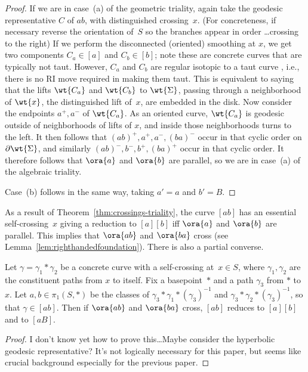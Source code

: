 \begin{proof}
  If we are in case~(a) of the geometric triality, again take the
  geodesic representative $C$ of $ab$, with distinguished
  crossing~$x$. (For concreteness, if necessary reverse the
  orientation of~$S$ so the branches appear in order \dots crossing to
  the right) If we
  perform the disconnected (oriented) smoothing at $x$, we get two
  components $C_a \in [a]$ and $C_b \in [b]$; note these are concrete
  curves that are typically not taut. However, $C_a$ and $C_b$ are
  regular isotopic to a taut curve \cite[Lemma 5.5]{Thurston14:PBI},
  i.e., there is no RI move required in making them taut. This is
  equivalent to saying that the lifts $\wt{C_a}$ and $\wt{C_b}$ to
  $\wt{\Sigma}$, passing through a neighborhood of $\wt{x}$, the
  distinguished lift of~$x$, are embedded in the disk. Now consider
  the endpoints $a^+, a^-$ of $\wt{C_a}$. As an oriented curve,
  $\wt{C_a}$ is geodesic outside of neighborhoods of lifts of $x$, and
  inside those neighborhoods turns to the left. It then follows that
  $(ab)^+, a^+, a^-, (ba)^-$ occur in that cyclic order on
  $\partial \wt{\Sigma}$, and similarly $(ab)^-, b^-,b^+,(ba)^+$ occur
  in that cyclic order. It therefore follows that $\ora{a}$ and
  $\ora{b}$ are parallel, so we are in case~(a) of the algebraic
  triality.

  Case~(b) follows in the same way, taking $a'=a$ and $b'=B$.
\end{proof}

As a result of Theorem~\ref{thm:crossings-triality}, the curve $[ab]$
has an essential self-crossing~$x$ giving a reduction to $[a][b]$ iff
$\ora{a}$ and $\ora{b}$ are parallel. This implies that $\ora{ab}$ and
$\ora{ba}$ cross (see Lemma~\ref{lem:righthandedfoundation}). There is
also a partial converse.

\begin{proposition}\label{prop:selfcrossing}
  Let $\gamma = \gamma_1 * \gamma_2$ be a concrete curve with a
  self-crossing at~$x \in S$, where $\gamma_1,\gamma_2$ are the
  constituent paths from $x$ to itself. Fix a basepoint~$*$ and a path
  $\gamma_3$ from $*$ to~$x$. Let $a,b \in \pi_1(S, *)$ be the classes
  of $\gamma_3 * \gamma_1 * (\gamma_3)^{-1}$ and
  $\gamma_3 * \gamma_2 * (\gamma_3)^{-1}$, so that $\gamma \in [ab]$.
  Then if $\ora{ab}$ and $\ora{ba}$ cross, $[ab]$ reduces to $[a][b]$
  and to $[aB]$.
\end{proposition}

\begin{proof}
  I don't know yet how to prove this\dots Maybe consider the
  hyperbolic geodesic representative? It's not logically necessary for
  this paper, but seems like crucial background especially for the
  previous paper.
\end{proof}


